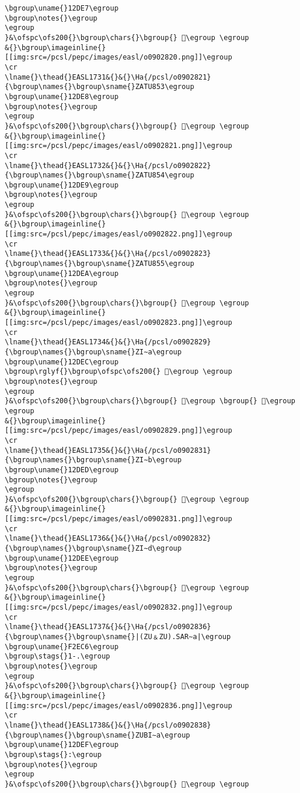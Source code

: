 \begin{verbatim}
\bgroup\uname{}12DE7\egroup
\bgroup\notes{}\egroup
\egroup
}&\ofspc\ofs200{}\bgroup\chars{}\bgroup{} 𒷧\egroup \egroup
&{}\bgroup\imageinline{}[[img:src=/pcsl/pepc/images/easl/o0902820.png]]\egroup
\cr
\lname{}\thead{}EASL1731&{}&{}\Ha{/pcsl/o0902821}{\bgroup\names{}\bgroup\sname{}ZATU853\egroup
\bgroup\uname{}12DE8\egroup
\bgroup\notes{}\egroup
\egroup
}&\ofspc\ofs200{}\bgroup\chars{}\bgroup{} 𒷨\egroup \egroup
&{}\bgroup\imageinline{}[[img:src=/pcsl/pepc/images/easl/o0902821.png]]\egroup
\cr
\lname{}\thead{}EASL1732&{}&{}\Ha{/pcsl/o0902822}{\bgroup\names{}\bgroup\sname{}ZATU854\egroup
\bgroup\uname{}12DE9\egroup
\bgroup\notes{}\egroup
\egroup
}&\ofspc\ofs200{}\bgroup\chars{}\bgroup{} 𒷩\egroup \egroup
&{}\bgroup\imageinline{}[[img:src=/pcsl/pepc/images/easl/o0902822.png]]\egroup
\cr
\lname{}\thead{}EASL1733&{}&{}\Ha{/pcsl/o0902823}{\bgroup\names{}\bgroup\sname{}ZATU855\egroup
\bgroup\uname{}12DEA\egroup
\bgroup\notes{}\egroup
\egroup
}&\ofspc\ofs200{}\bgroup\chars{}\bgroup{} 𒷪\egroup \egroup
&{}\bgroup\imageinline{}[[img:src=/pcsl/pepc/images/easl/o0902823.png]]\egroup
\cr
\lname{}\thead{}EASL1734&{}&{}\Ha{/pcsl/o0902829}{\bgroup\names{}\bgroup\sname{}ZI∼a\egroup
\bgroup\uname{}12DEC\egroup
\bgroup\rglyf{}\bgroup\ofspc\ofs200{} 𒷬\egroup \egroup
\bgroup\notes{}\egroup
\egroup
}&\ofspc\ofs200{}\bgroup\chars{}\bgroup{} 𒷫\egroup \bgroup{} 𒷬\egroup \egroup
&{}\bgroup\imageinline{}[[img:src=/pcsl/pepc/images/easl/o0902829.png]]\egroup
\cr
\lname{}\thead{}EASL1735&{}&{}\Ha{/pcsl/o0902831}{\bgroup\names{}\bgroup\sname{}ZI∼b\egroup
\bgroup\uname{}12DED\egroup
\bgroup\notes{}\egroup
\egroup
}&\ofspc\ofs200{}\bgroup\chars{}\bgroup{} 𒷭\egroup \egroup
&{}\bgroup\imageinline{}[[img:src=/pcsl/pepc/images/easl/o0902831.png]]\egroup
\cr
\lname{}\thead{}EASL1736&{}&{}\Ha{/pcsl/o0902832}{\bgroup\names{}\bgroup\sname{}ZI∼d\egroup
\bgroup\uname{}12DEE\egroup
\bgroup\notes{}\egroup
\egroup
}&\ofspc\ofs200{}\bgroup\chars{}\bgroup{} 𒷮\egroup \egroup
&{}\bgroup\imageinline{}[[img:src=/pcsl/pepc/images/easl/o0902832.png]]\egroup
\cr
\lname{}\thead{}EASL1737&{}&{}\Ha{/pcsl/o0902836}{\bgroup\names{}\bgroup\sname{}|(ZU﹠ZU).SAR∼a|\egroup
\bgroup\uname{}F2EC6\egroup
\bgroup\stags{}1-.\egroup
\bgroup\notes{}\egroup
\egroup
}&\ofspc\ofs200{}\bgroup\chars{}\bgroup{} 󲻆\egroup \egroup
&{}\bgroup\imageinline{}[[img:src=/pcsl/pepc/images/easl/o0902836.png]]\egroup
\cr
\lname{}\thead{}EASL1738&{}&{}\Ha{/pcsl/o0902838}{\bgroup\names{}\bgroup\sname{}ZUBI∼a\egroup
\bgroup\uname{}12DEF\egroup
\bgroup\stags{}:\egroup
\bgroup\notes{}\egroup
\egroup
}&\ofspc\ofs200{}\bgroup\chars{}\bgroup{} 𒷯\egroup \egroup

\end{verbatim}
